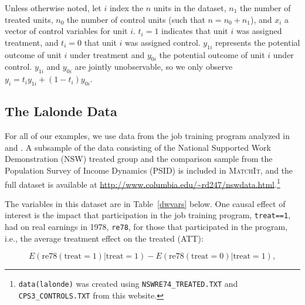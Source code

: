 \documentclass[oneside,letterpaper,titlepage]{article}
\newcommand{\MatchIt}{\textsc{MatchIt}}
\begin{document}
Unless otherwise noted, let $i$ index the $n$ units in the dataset,
$n_1$ the number of treated units, $n_0$ the number of control units
(such that $n=n_0+n_1$), and $x_i$ a vector of control variables for
unit $i$.  $t_i=1$ indicates that unit $i$ was assigned treatment, and
$t_i=0$ that unit $i$ was assigned control.  $y_{1i}$ represents the
potential outcome of unit $i$ under treatment and $y_{0i}$ the
potential outcome of unit $i$ under control.  $y_{1i}$ and $y_{0i}$
are jointly unobservable, so we only observe
$y_i=t_iy_{1i}+(1-t_i)y_{0i}$.

\subsection{The Lalonde Data}
For all of our examples, we use data from the job training program
analyzed in \citet{lalonde86} and \citet{DehWah99}.  A subsample of
the data consisting of the National Supported Work Demonstration (NSW)
treated group and the comparison sample from the Population Survey of
Income Dynamics (PSID) is included in \MatchIt, and the full dataset
is available at
\url{http://www.columbia.edu/~rd247/nswdata.html}.\footnote{\texttt{data(lalonde)}
  was created using \texttt{NSWRE74\_TREATED.TXT} and
  \texttt{CPS3\_CONTROLS.TXT} from this website.}

The variables in this dataset are in Table~\ref{dwvars} below.  One
causal effect of interest is the impact that participation in the job
training program, \texttt{treat==1}, had on real earnings in 1978,
\texttt{re78}, for those that participated in the program, i.e., the
average treatment effect on the treated (ATT):

\begin{equation}\label{re78eqn}
E(\text{re78}(\text{treat}=1) | \text{treat}=1) - E(\text{re78}(\text{treat}=0) | \text{treat}=1),
\end{equation}
\end{document}

